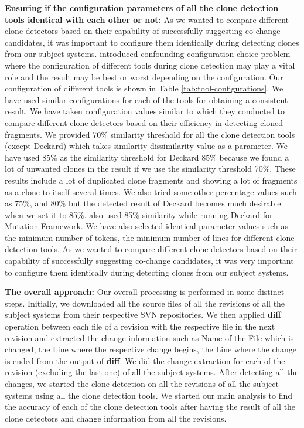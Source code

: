 \documentclass[review]{elsarticle}
\begin{document}
\vspace{1mm}
\textbf{Ensuring if the configuration parameters of all the clone detection tools identical with each other or not:} As we wanted to compare different clone detectors based on their capability of successfully suggesting co-change candidates, it was important to configure them identically during detecting clones from our subject systems. \citet{Wang-2013-SBC-2491411-2491420} introduced confounding configuration choice problem where the configuration of different tools during clone detection may play a vital role and the result may be best or worst depending on the configuration. Our configuration of different tools is shown in Table \ref{tab:tool-configurations}. We have used similar configurations for each of the tools for obtaining a consistent result. We have taken configuration values similar to \citet{jeff-evaluating} which they conducted to compare different clone detectors based on their efficiency in detecting cloned fragments. We provided 70\% similarity threshold for all the clone detection tools (except Deckard) which takes similarity dissimilarity value as a parameter. We have used 85\% as the similarity threshold for Deckard 85\% because we found a lot of unwanted clones in the result if we use the similarity threshold 70\%. These results include a lot of duplicated clone fragments and showing a lot of fragments as a clone to itself several times. We also tried some other percentage values such as 75\%, and 80\% but the detected result of Deckard becomes much desirable when we set it to 85\%. \citet{jeff-evaluating} also used 85\% similarity while running Deckard for Mutation Framework. We have also selected identical parameter values such as the minimum number of tokens, the minimum number of lines for different clone detection tools. As we wanted to compare different clone detectors based on their capability of successfully suggesting co-change candidates, it was very important to configure them identically during detecting clones from our subject systems.

\textbf{The overall approach:} Our overall processing is performed in some distinct steps.  Initially, we downloaded all the source files of all the revisions of all the subject systems from their respective SVN repositories. We then applied \textbf{diff} operation between each file of a revision with the respective file in the next revision and extracted the change information such as Name of the File which is changed, the Line where the respective change begins, the Line where the change is ended from the output of \textbf{diff}. We did the change extraction for each of the revision (excluding the last one) of all the subject systems. After detecting all the changes, we started the clone detection on all the revisions of all the subject systems using all the clone detection tools. We started our main analysis to find the accuracy of each of the clone detection tools after having the result of all the clone detectors and change information from all the revisions. 
\end{document}

